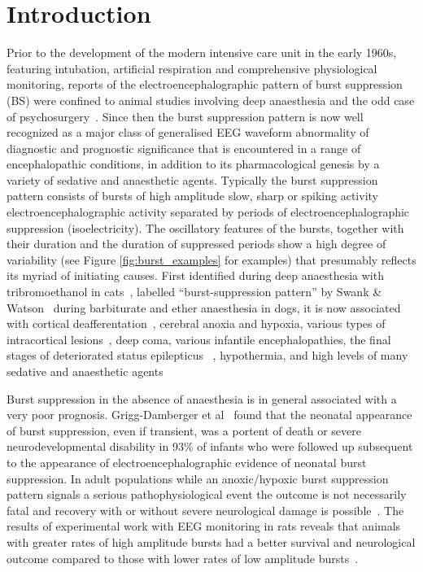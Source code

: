 \documentclass[a4paper,12pt]{article}
\begin{document}
\section{Introduction}
Prior to the development of the modern intensive care unit in the early
1960s, featuring intubation, artificial respiration and comprehensive
physiological monitoring, reports of the electroencephalographic
pattern of burst suppression (BS) were confined to animal studies involving
deep anaesthesia and the odd case of psychosurgery~\cite{Niedermeyer2009}. Since then the burst suppression pattern is now well recognized as
a major class of generalised EEG waveform abnormality of diagnostic
and prognostic significance that is encountered in a range of
encephalopathic conditions, in addition to its pharmacological genesis
by a variety of sedative and anaesthetic agents. Typically the burst
suppression pattern consists of bursts of high amplitude slow, sharp or
spiking activity electroencephalographic activity separated by periods
of electroencephalographic suppression (isoelectricity). The oscillatory
features of the bursts, together with their duration and the duration of
suppressed periods show a high degree of variability (see Figure \ref{fig:burst_examples} for examples) that presumably reflects its
myriad of initiating causes. First identified
during deep anaesthesia with tribromoethanol in cats~\cite{Derbyshire31071936}, labelled “burst-suppression pattern” by Swank \& Watson~\cite{Swank01031949} during barbiturate and ether anaesthesia in dogs,
it is now
associated with cortical deafferentation~\cite{Henry19521},
cerebral anoxia and hypoxia, various types of intracortical lesions~\cite{FischerWilliams1963568}, deep coma, various infantile
encephalopathies, the final stages of deteriorated status epilepticus~\cite{Treiman199049}
, hypothermia, and high levels of many sedative
and anaesthetic agents~\cite{Schwartz1989}~\cite{Akrawi1996}

Burst suppression in the absence of anaesthesia is in general
associated with a very poor prognosis. Grigg-Damberger et al~\cite{GriggDamberger198984}
found that the neonatal appearance of burst suppression, even if
transient, was a portent of death or severe neurodevelopmental
disability in 93\% of infants who were followed up subsequent to the
appearance of electroencephalographic evidence of neonatal burst
suppression. In adult populations while an anoxic/hypoxic burst
suppression pattern signals a serious pathophysiological event the
outcome is not necessarily fatal and recovery with or without severe
neurological damage is possible~\cite{Niedermeyer2009}. The results of
experimental work with EEG monitoring in rats reveals that animals with
greater rates of high amplitude bursts had a better survival and
neurological outcome compared to those with lower rates of low
amplitude bursts~\cite{Geocadin2002193}.
\end{document}
